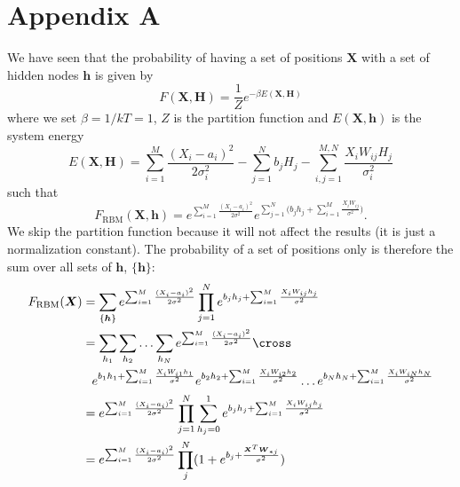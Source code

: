 \section{Appendix A}
We have seen that the probability of having a set of positions $\boldsymbol{X}$ with a set of hidden nodes $\boldsymbol{h}$ is given by
\begin{equation}
F(\boldsymbol{X},\boldsymbol{H})=\frac{1}{Z}e^{-\beta E(\boldsymbol{X},\boldsymbol{H})}
\end{equation}
where we set $\beta=1/kT=1$, $Z$ is the partition function and $E(\boldsymbol{X},\boldsymbol{h})$ is the system energy
\begin{equation}
E(\boldsymbol{X},\boldsymbol{H})=\sum_{i=1}^{M}\frac{(X_i-a_i)^2}{2\sigma_i^2}-\sum_{j=1}^Nb_jH_j-\sum_{i,j=1}^{M,N}\frac{X_iW_{ij}H_j}{\sigma_i^2}
\end{equation}
such that
\begin{equation}
F_{\text{RBM}}(\boldsymbol{X},\boldsymbol{h})=e^{\sum_{i=1}^M \frac{(X_i - a_i)^2}{2\sigma^2}} e^{\sum_{j=1}^N\Big(b_jh_j+\sum_{i=1}^M\frac{X_iW_{ij}}{\sigma^2}\Big)}.
\end{equation}
We skip the partition function because it will not affect the results (it is just a normalization constant). The probability of a set of positions only is therefore the sum over all sets of $\boldsymbol{h}$, $\{\boldsymbol{h}\}$:
\begin{align}
F_{\text{RBM}}(\boldsymbol{X})&=\sum_{\{\boldsymbol{h}\}}e^{\sum_{i=1}^M \frac{(X_i - a_i)^2}{2\sigma^2}} \prod_{j=1}^Ne^{b_jh_j+\sum_{i=1}^M\frac{X_iW_{ij}h_j}{\sigma^2}}\notag\\
&=\sum_{h_1}\sum_{h_2}\hdots\sum_{h_N}e^{\sum_{i=1}^M \frac{(X_i - a_i)^2}{2\sigma^2}}\cross\notag\\
&\phantom{=}e^{b_1h_1+\sum_{i=1}^M\frac{X_iW_{i1}h_1}{\sigma^2}}e^{b_2h_2+\sum_{i=1}^M\frac{X_iW_{i2}h_2}{\sigma^2}}\hdots e^{b_Nh_N+\sum_{i=1}^M\frac{X_iW_{iN}h_N}{\sigma^2}}\notag\\
&=e^{\sum_{i=1}^M \frac{(X_i - a_i)^2}{2\sigma^2}}\prod_{j=1}^N\sum_{h_j=0}^1e^{b_jh_j+\sum_{i=1}^M \frac{X_i W_{ij}h_j}{\sigma^2}}\notag\\
&=e^{\sum_{i=1}^M \frac{(X_i - a_i)^2}{2\sigma^2}} \prod_j^N (1+ e^{b_j + \frac{\boldsymbol{X}^T\boldsymbol{W}_{*j}}{\sigma^2}})
\end{align}